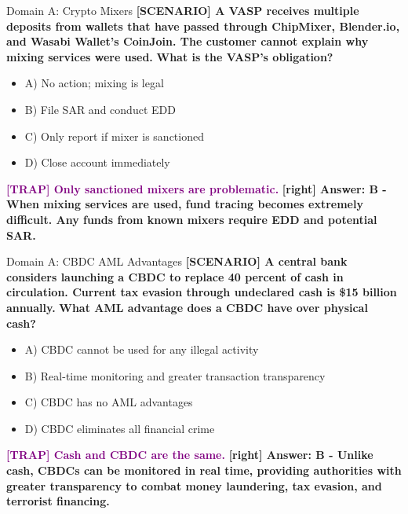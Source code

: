 \documentclass[11pt,a4paper]{beamer}
\newcommand{\trap}[1]{\textcolor{purple}{\textbf{[TRAP] #1}}}
\newcommand{\correct}[1]{\textcolor{green!50!black}{\textbf{[right] #1}}}
\newcommand{\scenario}[1]{\textcolor{blue!70!black}{\textbf{[SCENARIO] #1}}}
\begin{document}
\begin{frame}{Domain A: Crypto Mixers}
\scenario{A VASP receives multiple deposits from wallets that have passed through ChipMixer, Blender.io, and Wasabi Wallet's CoinJoin. The customer cannot explain why mixing services were used.}
\vspace{0.2cm}
\textbf{What is the VASP's obligation?}
\vspace{0.2cm}
\begin{itemize}
    \item A) No action; mixing is legal
    \item B) File SAR and conduct EDD
    \item C) Only report if mixer is sanctioned
    \item D) Close account immediately
\end{itemize}
\vspace{0.2cm}
\trap{Only sanctioned mixers are problematic.}
\correct{Answer: B - When mixing services are used, fund tracing becomes extremely difficult. Any funds from known mixers require EDD and potential SAR.}
\end{frame}

\begin{frame}{Domain A: CBDC AML Advantages}
\scenario{A central bank considers launching a CBDC to replace 40 percent of cash in circulation. Current tax evasion through undeclared cash is \$15 billion annually.}
\vspace{0.2cm}
\textbf{What AML advantage does a CBDC have over physical cash?}
\vspace{0.2cm}
\begin{itemize}
    \item A) CBDC cannot be used for any illegal activity
    \item B) Real-time monitoring and greater transaction transparency
    \item C) CBDC has no AML advantages
    \item D) CBDC eliminates all financial crime
\end{itemize}
\vspace{0.2cm}
\trap{Cash and CBDC are the same.}
\correct{Answer: B - Unlike cash, CBDCs can be monitored in real time, providing authorities with greater transparency to combat money laundering, tax evasion, and terrorist financing.}
\end{frame}
\end{document}
